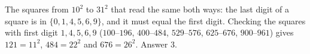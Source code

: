 The squares from $10^2$ to $31^2$ that read the same both ways: the last digit of a square is in $\{0,1,4,5,6,9\}$, and it must equal the first digit. Checking the squares with first digit $1,4,5,6,9$ ($100$--$196$, $400$--$484$, $529$--$576$, $625$--$676$, $900$--$961$) gives $121=11^2$, $484=22^2$ and $676=26^2$. Answer $\boxed{3}$.
